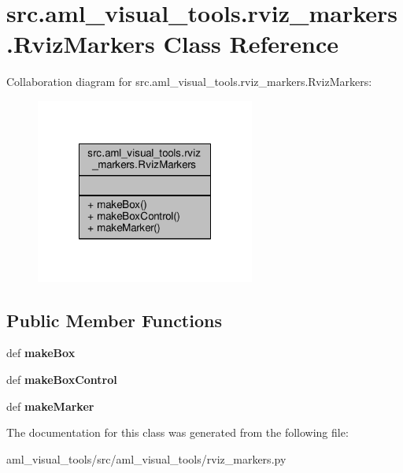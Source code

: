 \hypertarget{classsrc_1_1aml__visual__tools_1_1rviz__markers_1_1_rviz_markers}{\section{src.\-aml\-\_\-visual\-\_\-tools.\-rviz\-\_\-markers.\-Rviz\-Markers Class Reference}
\label{classsrc_1_1aml__visual__tools_1_1rviz__markers_1_1_rviz_markers}
}


Collaboration diagram for src.\-aml\-\_\-visual\-\_\-tools.\-rviz\-\_\-markers.\-Rviz\-Markers\-:\nopagebreak
\begin{figure}[H]
\begin{center}
\leavevmode
\includegraphics[width=204pt]{classsrc_1_1aml__visual__tools_1_1rviz__markers_1_1_rviz_markers__coll__graph}
\end{center}
\end{figure}
\subsection*{Public Member Functions}
\begin{DoxyCompactItemize}
\item 
\hypertarget{classsrc_1_1aml__visual__tools_1_1rviz__markers_1_1_rviz_markers_a1464d08c98c0f8b2758fe2e51ada4f83}{def {\bfseries make\-Box}}\label{classsrc_1_1aml__visual__tools_1_1rviz__markers_1_1_rviz_markers_a1464d08c98c0f8b2758fe2e51ada4f83}

\item 
\hypertarget{classsrc_1_1aml__visual__tools_1_1rviz__markers_1_1_rviz_markers_ad2b04b2daf7bb17fa2ccbb5b11e00554}{def {\bfseries make\-Box\-Control}}\label{classsrc_1_1aml__visual__tools_1_1rviz__markers_1_1_rviz_markers_ad2b04b2daf7bb17fa2ccbb5b11e00554}

\item 
\hypertarget{classsrc_1_1aml__visual__tools_1_1rviz__markers_1_1_rviz_markers_a2f922b4a7dd10eff8f06223e15028909}{def {\bfseries make\-Marker}}\label{classsrc_1_1aml__visual__tools_1_1rviz__markers_1_1_rviz_markers_a2f922b4a7dd10eff8f06223e15028909}

\end{DoxyCompactItemize}


The documentation for this class was generated from the following file\-:\begin{DoxyCompactItemize}
\item 
aml\-\_\-visual\-\_\-tools/src/aml\-\_\-visual\-\_\-tools/rviz\-\_\-markers.\-py\end{DoxyCompactItemize}
